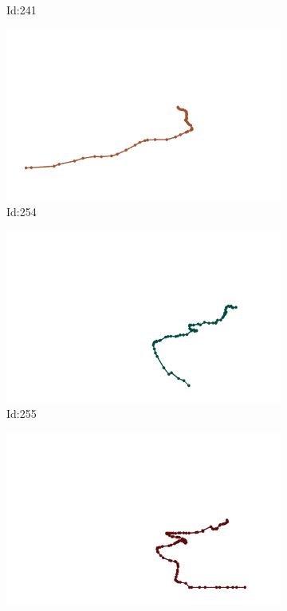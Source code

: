 \documentclass[12pt,twoside]{report}
\begin{document}
\begin{figure}
\begin{subfigure}[b]{0.20\textwidth}
\caption{Id:241}
\end{subfigure}
\begin{subfigure}[b]{0.20\textwidth}
\centering
\includegraphics[width=\textwidth]{../trajectories/254.png}
\caption{Id:254}
\end{subfigure}
\begin{subfigure}[b]{0.20\textwidth}
\centering
\includegraphics[width=\textwidth]{../trajectories/255.png}
\caption{Id:255}
\end{subfigure}
\begin{subfigure}[b]{0.20\textwidth}
\centering
\includegraphics[width=\textwidth]{../trajectories/327.png}

\end{subfigure}
\end{figure}
\end{document}
